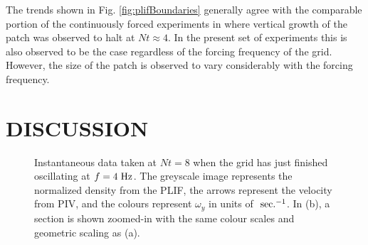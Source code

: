 \documentclass{piv13-abstract}
\newcommand{\unit}[1]{\ensuremath{\, \mathrm{\hspace{0.5mm}#1}}}
\newcommand{\figLabel}{Fig. }
\begin{document}
The trends shown in \figLabel\ref{fig:plifBoundaries} generally agree with the comparable portion of the continuously forced experiments in \cite{Silva1998} where vertical growth of the patch was observed to halt at $Nt\approx4$. In the present set of experiments this is also observed to be the case regardless of the forcing frequency of the grid. However, the size of the patch is observed to vary considerably with the forcing frequency.

\section{DISCUSSION}

\begin{figure}[h]
\centering
{}
\caption{Instantaneous data taken at $Nt=8$ when the grid has just finished oscillating at $f=4\unit{Hz}$. The greyscale image represents the normalized density from the PLIF, the arrows represent the velocity from PIV, and the colours represent $\omega_y$ in units of $\unit{sec.^{-1}}$. In (b), a section is shown zoomed-in with the same colour scales and geometric scaling as (a). \label{fig:isoLow}}
\end{figure}
\end{document}

